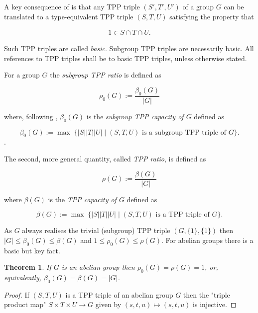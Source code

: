 \documentclass{amsart}
\newtheorem{theorem}{Theorem}[section]
\theoremstyle{observation}
\theoremstyle{definition}
\theoremstyle{remark}
\numberwithin{equation}{section}
\begin{document}
A key consequence of \citep[Observation 2.1]{Neu2011} is that any TPP triple $(S', T', U')$ of a group $G$ can be translated to a type-equivalent TPP triple $(S, T, U)$ satisfying the property that

\begin{align}1 \in S \cap T \cap U.
\end{align}

Such TPP triples are called \emph{basic}. Subgroup TPP triples are necessarily basic. All references to TPP triples shall be to basic TPP triples, unless otherwise stated.

\vspace{1mm}

For a group $G$ the \emph{subgroup TPP ratio} is defined as

\begin{equation}\label{TPPRho0}
\rho_0(G) := \frac{\beta_0(G)}{|G|}
\end{equation}

where, following \citep{Neu2011, Mur}, $\beta_0(G)$ is the \emph{subgroup TPP capacity of $G$} defined as

\begin{equation}\label{TPPBeta0}
\beta_0(G) := \max \;\{|S||T||U| \mid (S,T,U) \textrm{ is a subgroup TPP triple of }G\}.
\end{equation}.

The second, more general quantity, called \emph{TPP ratio}, is defined as

\begin{equation}\label{TPPRho}
\rho(G) := \frac{\beta(G)}{|G|}
\end{equation}

where $\beta(G)$ is the \emph{TPP capacity of $G$} defined as

\begin{equation}\label{TPPBeta}
\beta(G) := \max \;\{|S||T||U| \mid (S,T,U) \textrm{ is a TPP triple of }G\}. 
\end{equation}

As $G$ always realises the trivial (subgroup) TPP triple $(G,\{1\},\{1\})$ then $|G| \leq \beta_0(G) \leq \beta(G)$ and $1 \leq \rho_0(G) \leq \rho(G)$. For abelian groups there is a basic but key fact.

\begin{theorem}\textup{\citep[from the proof of Lemma 3.1]{CU}}\label{ThmRhoAbelianGroups} If $G$ is an abelian group then $\rho_0(G) = \rho(G) = 1$, or, equivalently, $\beta_0(G) = \beta(G) = |G|$.
\end{theorem}
\begin{proof} If $(S, T, U)$ is a TPP triple of an abelian group $G$ then the "triple product map" $S \times T \times U \longrightarrow G$ given by $(s, t, u) \longmapsto (s, t, u)$ is injective.
\end{proof}
\end{document}
